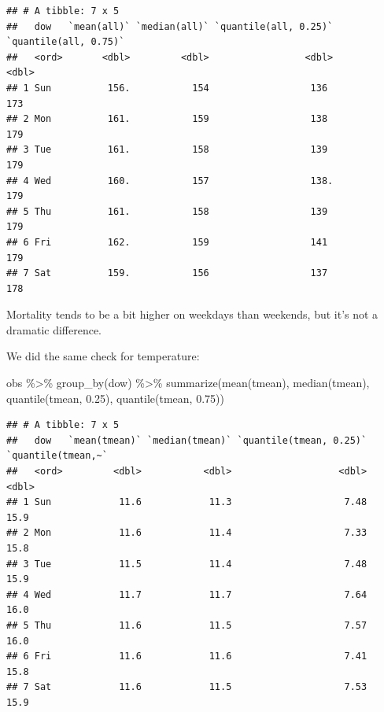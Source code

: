 \documentclass[
]{book}
\newenvironment{Shaded}{\begin{snugshade}}{\end{snugshade}}
\newcommand{\FloatTok}[1]{\textcolor[rgb]{0.00,0.00,0.81}{#1}}
\newcommand{\FunctionTok}[1]{\textcolor[rgb]{0.00,0.00,0.00}{#1}}
\newcommand{\NormalTok}[1]{#1}
\newcommand{\SpecialCharTok}[1]{\textcolor[rgb]{0.00,0.00,0.00}{#1}}
\begin{document}
\begin{verbatim}
## # A tibble: 7 x 5
##   dow   `mean(all)` `median(all)` `quantile(all, 0.25)` `quantile(all, 0.75)`
##   <ord>       <dbl>         <dbl>                 <dbl>                 <dbl>
## 1 Sun          156.           154                  136                    173
## 2 Mon          161.           159                  138                    179
## 3 Tue          161.           158                  139                    179
## 4 Wed          160.           157                  138.                   179
## 5 Thu          161.           158                  139                    179
## 6 Fri          162.           159                  141                    179
## 7 Sat          159.           156                  137                    178
\end{verbatim}

Mortality tends to be a bit higher on weekdays than weekends, but it's not
a dramatic difference.

We did the same check for temperature:

\begin{Shaded}
\begin{Highlighting}[]
\NormalTok{obs }\SpecialCharTok{\%\textgreater{}\%} 
  \FunctionTok{group\_by}\NormalTok{(dow) }\SpecialCharTok{\%\textgreater{}\%} 
  \FunctionTok{summarize}\NormalTok{(}\FunctionTok{mean}\NormalTok{(tmean), }
            \FunctionTok{median}\NormalTok{(tmean), }
            \FunctionTok{quantile}\NormalTok{(tmean, }\FloatTok{0.25}\NormalTok{), }
            \FunctionTok{quantile}\NormalTok{(tmean, }\FloatTok{0.75}\NormalTok{))}
\end{Highlighting}
\end{Shaded}

\begin{verbatim}
## # A tibble: 7 x 5
##   dow   `mean(tmean)` `median(tmean)` `quantile(tmean, 0.25)` `quantile(tmean,~`
##   <ord>         <dbl>           <dbl>                   <dbl>              <dbl>
## 1 Sun            11.6            11.3                    7.48               15.9
## 2 Mon            11.6            11.4                    7.33               15.8
## 3 Tue            11.5            11.4                    7.48               15.9
## 4 Wed            11.7            11.7                    7.64               16.0
## 5 Thu            11.6            11.5                    7.57               16.0
## 6 Fri            11.6            11.6                    7.41               15.8
## 7 Sat            11.6            11.5                    7.53               15.9
\end{verbatim}
\end{document}
